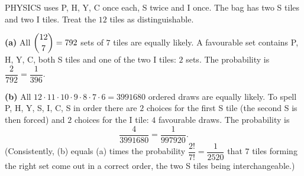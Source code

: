 PHYSICS uses P, H, Y, C once each, S twice and I once. The bag has two S tiles and two I tiles. Treat the $12$ tiles as distinguishable.

\textbf{(a)} All $\dbinom{12}{7}=792$ sets of $7$ tiles are equally likely. A favourable set contains P, H, Y, C, both S tiles and one of the two I tiles: $2$ sets. The probability is $\dfrac{2}{792}=\boxed{\dfrac{1}{396}}$.

\textbf{(b)} All $12\cdot11\cdot10\cdot9\cdot8\cdot7\cdot6=3991680$ ordered draws are equally likely. To spell P, H, Y, S, I, C, S in order there are $2$ choices for the first S tile (the second S is then forced) and $2$ choices for the I tile: $4$ favourable draws. The probability is
\[
\dfrac{4}{3991680}=\boxed{\dfrac{1}{997920}} .
\]
(Consistently, (b) equals (a) times the probability $\dfrac{2!}{7!}=\dfrac{1}{2520}$ that $7$ tiles forming the right set come out in a correct order, the two S tiles being interchangeable.)
